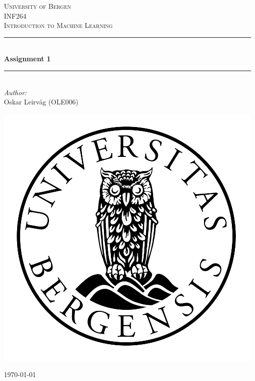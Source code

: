 \begin{titlepage}
    \newcommand{\HRule}{\rule{\linewidth}{0.5mm}}
    \center

    \textsc{\LARGE University of Bergen}\\[1.5cm] %
    \textsc{\Large INF264}\\[0.5cm] %
    \textsc{\large Introduction to Machine Learning}\\[0.5cm] %

    \HRule \\[0.4cm]
    { \huge \bfseries Assignment 1}\\[0.4cm] %
    \HRule \\[1.5cm]

    \Large \emph{Author:}\\
    Oskar Leirvåg (OLE006)
    \\[2cm] %

    \centerline{\includegraphics[scale=0.15]{figures/canvas}} %

    {\large \today}\\[3cm] %

    \vfill
\end{titlepage}
